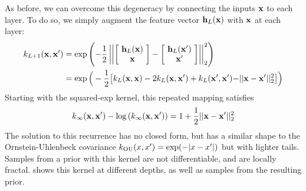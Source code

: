As before, we can overcome this degeneracy by %
connecting the inputs ${\bf{x}}$ to each layer.  To do so, we simply augment the feature vector ${\bf{h}}_{L}({\bf{x}})$ with ${\bf{x}}$ at each layer: 
%
\begin{align}
 k_{L+1}(\vx, \vx') %
& = \exp \left( -\frac{1}{2} \left|\left| \left[ \! \begin{array}{c} \hPhi_{L}(\vx) \\ {\color{black} \vx} \end{array} \! \right]  - \left[ \! \begin{array}{c} \hPhi_{L}(\vx') \\ {\color{black} \vx'} \end{array} \! \right] \right| \right|_2^2 \right) \nonumber \\
& = \exp \Big( -\frac{1}{2} \big[ k_{L}(\vx, \vx) - 2 k_{L}(\vx, \vx') %
 + k_{L}(\vx', \vx') {\color{black} - || \vx - \vx' ||_2^2} \big] \Big)
\end{align}
%
Starting with the squared-exp kernel, this repeated mapping satisfies
\begin{align}
k_\infty({\bf{x}}, {\bf{x}}') - \log \left( k_\infty({\bf{x}}, {\bf{x}}') \right) = 1 + \frac{1}{2} || {\bf{x}} - {\bf{x}}' ||_2^2
\end{align}
%
The solution to this recurrence has no closed form, but has a similar shape to the Ornstein-Uhlenbeck covariance ${k_{\textnormal{OU}}(x,x') = \exp( -|x - x'| )}$ but with lighter tails.
%
Samples from a \gp{} prior with this kernel are not differentiable, and are locally fractal.
 shows this kernel at different depths, as well as samples from the resulting \gp{} prior.

